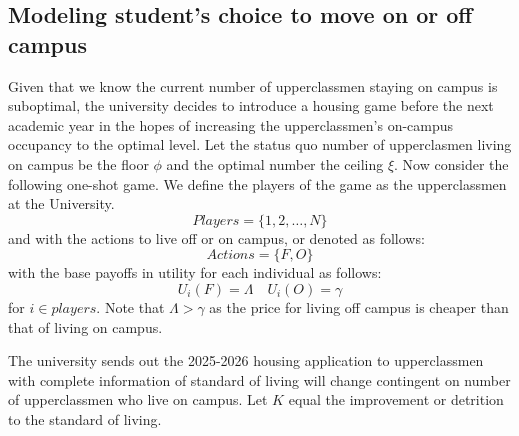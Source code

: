 \documentclass[12pt]{article}
\begin{document}
\subsection{Modeling student's choice to move on or off campus}
Given that we know the current number of upperclassmen staying on campus is suboptimal, the university decides to introduce a housing game before the next academic year in the hopes of increasing the upperclassmen's on-campus occupancy to the optimal level. Let the status quo number of upperclasmen living on campus be the floor $\phi$ and the optimal number the ceiling $\xi$. Now consider the following one-shot game. We define the players of the game as the upperclassmen at the University.
\[
Players = \{1, 2, \dots, N \}
\]
and with the actions to live off or on campus, or denoted as follows:
\[
Actions = \{F, O\}
\]
with the base payoffs in utility for each individual as follows:
\[
U_i(F) = \Lambda \quad U_i(O) = \gamma
\]
for $i \in players$. Note that $\Lambda > \gamma$ as the price for living off campus is cheaper than that of living on campus. 

The university sends out the 2025-2026 housing application to upperclassmen with complete information of standard of living will change contingent on number of upperclassmen who live on campus. Let $K$ equal the improvement or detrition to the standard of living. 
\end{document}
